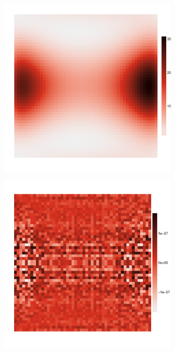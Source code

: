 \documentclass{article}
\begin{document}
\begin{figure}
\begin{subfigure}{0.3\textwidth}
		\includegraphics[width=\linewidth]{figures/y114}\\
	\end{subfigure}
	\begin{subfigure}{0.3\textwidth}
		\includegraphics[width=\linewidth]{figures/res110}\\

\end{subfigure}
\end{figure}
\end{document}
